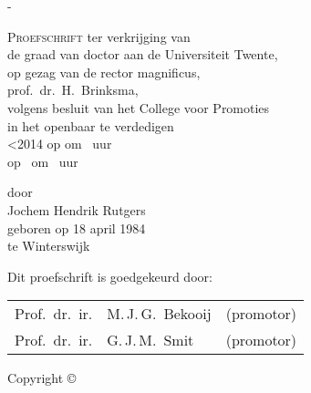 \thispagestyle{empty}

\calccentering{\unitlength}
\begin{adjustwidth*}{\unitlength}{-\unitlength}
	\begin{center}
		\null\vfill
		{\begin{Spacing}{1.2}\LARGE\scshape\thetitle\end{Spacing}}
		{\ifthenelse{\equal{\thesubtitle}{}}{}{\mbox{} \\[1.5ex]\Large\scshape\thesubtitle}}
		\vfill
		\vfill
		{\scshape Proefschrift}
		\vfill
		ter verkrijging van\\
		de graad van doctor aan de Universiteit Twente,\\
		op gezag van de rector magnificus,\\
		prof.\ dr.\ H.\ Brinksma,\\
		volgens besluit van het College voor Promoties\\
		in het openbaar te verdedigen\\
\ifnum\texliveversion<2014
		op  om \thesistimedutch\ uur\\[3\onelineskip]
\else
		op \fullthesisdate\ om \thesistimedutch\ uur\\[3\onelineskip]
\fi

		door\\[\onelineskip]
		Jochem Hendrik Rutgers\\[2\onelineskip]
		geboren op 18 april 1984\\
		te Winterswijk
		\vfill
	\end{center}
\end{adjustwidth*}

\clearpage

\thispagestyle{empty}

\begin{flushleft}
Dit proefschrift is goedgekeurd door:\\
\bigskip
\def\small{\normalsize}%
\begin{tabular}{@{}r@{~~}ll}
Prof.~dr.~ir.\@		& M.\,J.\,G.~Bekooij	& (promotor) \\
Prof.~dr.~ir.\@		& G.\,J.\,M.~Smit		& (promotor) \\
\end{tabular}
\end{flushleft}

\vfill
{
Copyright \copyright\ \thesisyear\ \theauthor \\
 \thesisISBN
}

\cleardoublepage
